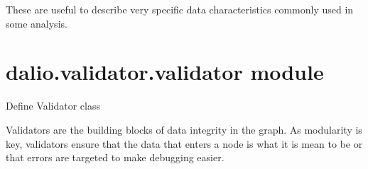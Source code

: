 \documentclass[letterpaper,10pt,english]{sphinxmanual}
\begin{document}
These are useful to describe very specific data characteristics commonly used
in some analysis.


\section{dalio.validator.validator module}
\label{\detokenize{dalio.validator:module-dalio.validator.validator}}\label{\detokenize{dalio.validator:dalio-validator-validator-module}}
Define Validator class

Validators are the building blocks of data integrity in the graph. As
modularity is key, validators ensure that the data that enters a node is what
it is mean to be or that errors are targeted to make debugging easier.
\end{document}
